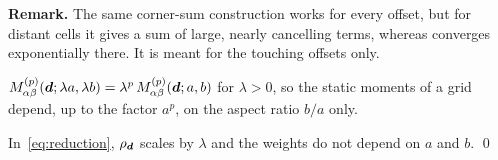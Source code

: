 \vspace{\baselineskip}
\noindent\textbf{Remark.} The same corner-sum construction works for every offset, but for distant cells it gives a
sum of large, nearly cancelling terms, whereas \GL{} converges exponentially there. It is meant for the touching
offsets only.

 $M^{(p)}_{\alpha\beta}(\vb*{d};\lambda a,\lambda b)=\lambda^p\,M^{(p)}_{\alpha\beta}(\vb*{d};a,b)$
for $\lambda>0$, so the static moments of a grid depend, up to the factor $a^p$, on the aspect ratio $b/a$ only.

\vspace{\baselineskip}
\proof In~\eqref{eq:reduction}, $\rho_{\vb*{d}}$ scales by $\lambda$ and the weights do not depend on $a$ and $b$. \qed
